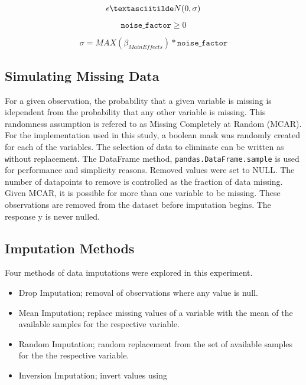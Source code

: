 \documentclass[../paper.tex]{subfiles}
\begin{document}
\begin{equation}\label{eq:epsilon_def}
  \epsilon \textasciitilde N(0, \sigma)
\end{equation}

\begin{equation}\label{eq:noise_factor_def}
  \texttt{noise_factor} \geq 0
\end{equation}

\begin{equation}\label{eq:noise_factor_sigma_def}
  \sigma = MAX(\beta_{Main Effects}) * \texttt{noise_factor}
\end{equation}




\subsection{Simulating Missing Data}
For a given observation, the probability that a given variable is missing is
idependent from the probability that any other variable is missing. This randomness
assumption is refered to as Missing Completely at Random (MCAR). For the implementation
used in this study, a boolean mask was randomly created for each
of the variables. The selection of data to eliminate can be written as
\texttt without replacement.
The DataFrame method, \texttt{pandas.DataFrame.sample} is used for
performance and simplicity reasons. Removed values were set to NULL. The number of
datapoints to remove is controlled as the fraction of data missing. Given MCAR,
it is possible for more than one variable to be missing. These observations are
removed from the dataset before imputation begins. The response y is never
nulled.


\subsection{Imputation Methods}
Four methods of data imputations were explored in this experiment.

\begin{itemize}
  \item Drop Imputation; removal of observations where any value is null.
  \item Mean Imputation; replace missing values of a variable with the mean of
  the available samples for the respective variable.
  \item Random Imputation; random replacement from the set of available samples
  for the the respective variable.
  \item Inversion Imputation; invert values using
\end{itemize}
\end{document}
